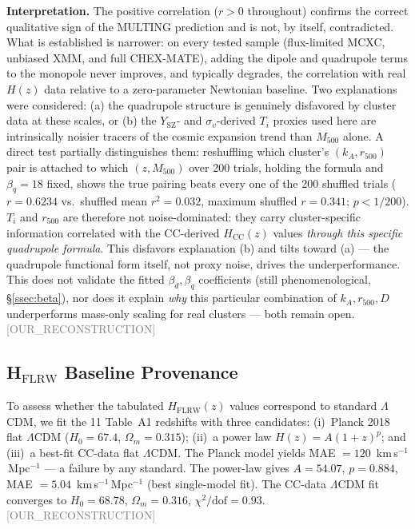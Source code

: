 \documentclass[twocolumn,prd,amsmath,amssymb,floatfix]{revtex4-2}
\newcommand{\reconstruction}{\textcolor{gray}{\small[OUR\_RECONSTRUCTION]}}
\begin{document}
\textbf{Interpretation.} The positive correlation ($r>0$ throughout)
confirms the correct qualitative sign of the MULTING prediction and is not,
by itself, contradicted. What is established is narrower: on every tested
sample (flux-limited MCXC, unbiased XMM, and full CHEX-MATE), adding the
dipole and quadrupole terms to the monopole never improves, and typically
degrades, the correlation with real $H(z)$ data relative to a
zero-parameter Newtonian baseline. Two explanations were considered: (a)
the quadrupole structure is genuinely disfavored by cluster data at these
scales, or (b) the $Y_\mathrm{SZ}$- and $\sigma_v$-derived $T_i$ proxies
used here are intrinsically noisier tracers of the cosmic expansion trend
than $M_{500}$ alone. A direct test partially distinguishes them: reshuffling
which cluster's $(k_A, r_{500})$ pair is attached to which $(z, M_{500})$
over 200 trials, holding the formula and $\beta_q=18$ fixed, shows the true
pairing beats every one of the 200 shuffled trials ($r=0.6234$ vs.\
shuffled mean $r^2=0.032$, maximum shuffled $r=0.341$; $p<1/200$). $T_i$
and $r_{500}$ are therefore not noise-dominated: they carry cluster-specific
information correlated with the CC-derived $H_\mathrm{CC}(z)$ values
\emph{through this specific quadrupole formula}. This disfavors explanation
(b) and tilts toward (a) --- the quadrupole functional form itself, not
proxy noise, drives the underperformance. This does not validate the fitted
$\beta_d,\beta_q$ coefficients (still phenomenological, \S\ref{ssec:beta}),
nor does it explain \emph{why} this particular combination of $k_A,
r_{500}, D$ underperforms mass-only scaling for real clusters --- both
remain open.
\reconstruction

\subsection{H$_\mathrm{FLRW}$ Baseline Provenance}
\label{ssec:hflrw}

To assess whether the tabulated $H_\mathrm{FLRW}(z)$ values correspond to
standard $\Lambda$CDM, we fit the 11 Table~A1 redshifts with three candidates:
(i)~Planck 2018 flat $\Lambda$CDM ($H_0 = 67.4$, $\Omega_m = 0.315$);
(ii)~a power law $H(z) = A(1+z)^p$; and (iii)~a best-fit CC-data flat $\Lambda$CDM.
The Planck model yields MAE $= 120$~km\,s$^{-1}$\,Mpc$^{-1}$ --- a failure by
any standard.  The power-law gives $A = 54.07$, $p = 0.884$,
MAE $= 5.04$~km\,s$^{-1}$\,Mpc$^{-1}$ (best single-model fit).
The CC-data $\Lambda$CDM fit converges to $H_0 = 68.78$, $\Omega_m = 0.316$,
$\chi^2/\mathrm{dof} = 0.93$.
\reconstruction
\end{document}
